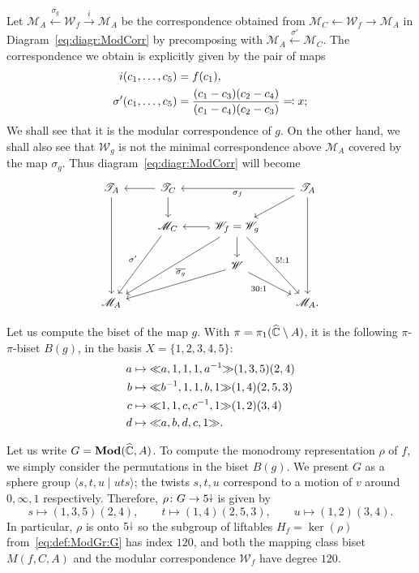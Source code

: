 \documentclass{amsart}
\begin{document}
Let $\mathscr M_A\overset{\overline{\sigma_g} }\longleftarrow\mathscr
W_f\overset{i }\longrightarrow\mathscr M_A$ be the correspondence
obtained from $\mathscr M_C\leftarrow\mathscr W_f\to\mathscr M_A$ in
Diagram~\eqref{eq:diagr:ModCorr} by precomposing with $\mathscr
M_A\overset{\sigma'}{\longleftarrow }\mathscr M_C$. The correspondence
we obtain is explicitly given by the pair of maps
\begin{align}
  i(c_1,\dots,c_5) &=f(c_1),\notag\\
  \sigma'(c_1,\dots,c_5) &= \frac{(c_1-c_3)(c_2-c_4)}{(c_1-c_4)(c_2-c_3)}\eqqcolon x;\label{eq:sigma'}
\end{align}
We shall see that it is the modular correspondence of $g$. On the
other hand, we shall also see that $\mathscr W_g$ is not the minimal
correspondence above $\mathscr M_A$ covered by the map $\sigma_g$.
Thus diagram~\eqref{eq:diagr:ModCorr} will become
\begin{equation}\label{eq:diagram pilgrim}
  \begin{tikzcd}
  \mathscr T_A\ar{ddd} & \mathscr T_C\ar{l}\ar{d} & & \mathscr T_A\ar{ll}{\sigma_{f}}\ar{dl}\ar{ddd}\\
  & \mathscr M_C\ar{ddl}[swap]{\sigma'} & \mathscr W_f=\mathscr W_g\ar[hook]{l}\ar{ddr}{5!:1}\ar{ddll}{\overline{\sigma_g}}\ar{d}\\
  & & \mathscr W\ar{dll}\ar{dr}[swap]{30:1}\\
  \mathscr M_A & & & \mathscr M_A.
\end{tikzcd}
\end{equation}

Let us compute the biset of the map $g$. With $\pi=\pi_1({\widehat{{\mathbb C}}}\setminus
A)$, it is the following $\pi$-$\pi$-biset $B(g)$, in the basis
$X=\{1,2,3,4,5\}$:
\begin{equation}
  \begin{aligned}
    a &\mapsto {\ll}a,1,1,1,a^{-1}{\gg}(1,3,5)(2,4)\\
    b &\mapsto {\ll}b^{-1},1,1,b,1{\gg}(1,4)(2,5,3)\\
    c &\mapsto {\ll}1,1,c,c^{-1},1{\gg}(1,2)(3,4)\\
    d &\mapsto {\ll}a,b,d,c,1{\gg}.
  \end{aligned}\label{eq:Fbiset}
\end{equation}

Let us write $G=\mathbf{\relax Mod}({\widehat{{\mathbb C}}},A)$. To compute the monodromy representation
$\rho$ of $f$, we simply consider the permutations in the biset
$B(g)$. We present $G$ as a sphere group
$\langle s,t,u\mid u t s\rangle$; the twists $s,t,u$ correspond to a
motion of $v$ around $0,\infty,1$ respectively. Therefore,
$\rho\colon G\to 5{\stackrel{\downarrow}{\smash.}}$ is given by
\[s\mapsto(1,3,5)(2,4),\qquad t\mapsto(1,4)(2,5,3),\qquad
u\mapsto(1,2)(3,4).
\]
In particular, $\rho$ is onto $5{\stackrel{\downarrow}{\smash.}}$ so the subgroup of liftables
$H_f=\ker(\rho)$ from~\eqref{eq:def:ModGr:G} has index $120$, and both
the mapping class biset $M(f,C,A)$ and the modular correspondence
$\mathscr W_f$ have degree $120$.
\end{document}

